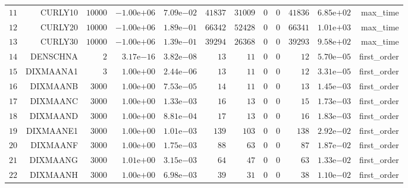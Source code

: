 \begin{longtable}{rrrrrrrrrrrr}
  \(    11\) & CURLY10 & \( 10000\) & \(-1.00\)e\(+06\) & \( 7.09\)e\(-02\) & \( 41837\) & \( 31009\) & \(     0\) & \(     0\) & \( 41836\) & \( 6.85\)e\(+02\) & max\_time \\
  \(    12\) & CURLY20 & \( 10000\) & \(-1.00\)e\(+06\) & \( 1.89\)e\(-01\) & \( 66342\) & \( 52428\) & \(     0\) & \(     0\) & \( 66341\) & \( 1.01\)e\(+03\) & max\_time \\
  \(    13\) & CURLY30 & \( 10000\) & \(-1.00\)e\(+06\) & \( 1.39\)e\(-01\) & \( 39294\) & \( 26368\) & \(     0\) & \(     0\) & \( 39293\) & \( 9.58\)e\(+02\) & max\_time \\
  \(    14\) & DENSCHNA & \(     2\) & \( 3.17\)e\(-16\) & \( 3.82\)e\(-08\) & \(    13\) & \(    11\) & \(     0\) & \(     0\) & \(    12\) & \( 5.70\)e\(-05\) & first\_order \\
  \(    15\) & DIXMAANA1 & \(     3\) & \( 1.00\)e\(+00\) & \( 2.44\)e\(-06\) & \(    13\) & \(    11\) & \(     0\) & \(     0\) & \(    12\) & \( 3.31\)e\(-05\) & first\_order \\
  \(    16\) & DIXMAANB & \(  3000\) & \( 1.00\)e\(+00\) & \( 7.53\)e\(-05\) & \(    14\) & \(    11\) & \(     0\) & \(     0\) & \(    13\) & \( 1.45\)e\(-03\) & first\_order \\
  \(    17\) & DIXMAANC & \(  3000\) & \( 1.00\)e\(+00\) & \( 1.33\)e\(-03\) & \(    16\) & \(    13\) & \(     0\) & \(     0\) & \(    15\) & \( 1.73\)e\(-03\) & first\_order \\
  \(    18\) & DIXMAAND & \(  3000\) & \( 1.00\)e\(+00\) & \( 8.81\)e\(-04\) & \(    17\) & \(    13\) & \(     0\) & \(     0\) & \(    16\) & \( 1.83\)e\(-03\) & first\_order \\
  \(    19\) & DIXMAANE1 & \(  3000\) & \( 1.00\)e\(+00\) & \( 1.01\)e\(-03\) & \(   139\) & \(   103\) & \(     0\) & \(     0\) & \(   138\) & \( 2.92\)e\(-02\) & first\_order \\
  \(    20\) & DIXMAANF & \(  3000\) & \( 1.00\)e\(+00\) & \( 1.75\)e\(-03\) & \(    88\) & \(    63\) & \(     0\) & \(     0\) & \(    87\) & \( 1.87\)e\(-02\) & first\_order \\
  \(    21\) & DIXMAANG & \(  3000\) & \( 1.01\)e\(+00\) & \( 3.15\)e\(-03\) & \(    64\) & \(    47\) & \(     0\) & \(     0\) & \(    63\) & \( 1.33\)e\(-02\) & first\_order \\
  \(    22\) & DIXMAANH & \(  3000\) & \( 1.00\)e\(+00\) & \( 6.98\)e\(-03\) & \(    39\) & \(    31\) & \(     0\) & \(     0\) & \(    38\) & \( 1.10\)e\(-02\) & first\_order \\

\end{longtable}
